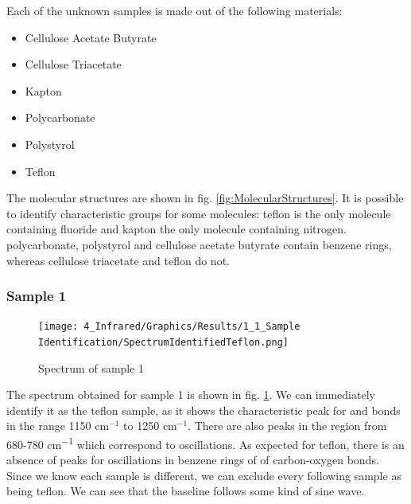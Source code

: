 \documentclass[12pt]{article}
\begin{document}
Each of the unknown samples is made out of the following materials:
\begin{itemize}
    \item Cellulose Acetate Butyrate
    \item Cellulose Triacetate
    \item Kapton
    \item Polycarbonate
    \item Polystyrol
    \item Teflon
\end{itemize}

The molecular structures are shown in fig. \ref{fig:MolecularStructures}. It is possible to identify characteristic groups for some molecules: teflon is the only molecule containing fluoride and kapton the only molecule containing nitrogen. polycarbonate, polystyrol and cellulose acetate butyrate contain benzene rings, whereas cellulose triacetate and teflon do not. 

\subsubsection{Sample 1}
\begin{figure}
    \centering
    \texttt{[image: 4\_Infrared/Graphics/Results/1\_1\_Sample Identification/SpectrumIdentifiedTeflon.png]}
    \caption{Spectrum of sample 1}
    \label{fig:SpectrumIdentifiedTeflon}
\end{figure}
The spectrum obtained for sample 1 is shown in fig. \ref{fig:SpectrumIdentifiedTeflon}. We can immediately identify it as the teflon sample, as it shows the characteristic peak for  and  bonds in the range 1150 cm$^{-1}$ to 1250 cm$^{-1}$. There are also peaks in the region from 680-780 \si{cm^{-1}} which correspond to  oscillations. As expected for teflon, there is an absence of peaks for oscillations in benzene rings of of carbon-oxygen bonds. Since we know each sample is different, we can exclude every following sample as being teflon. We can see that the baseline follows some kind of sine wave. 
\end{document}
